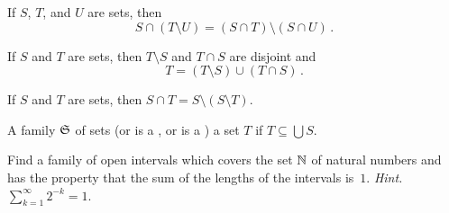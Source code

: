 \begin{prob} If $S$, $T$, and $U$ are sets, then
  \[ S \cap (T \setminus U)  = (S  \cap T)  \setminus (S \cap U)\,. \]
\end{prob}

\begin{prob}\label{prob_sdiff1} If $S$ and $T$ are sets, then $T \setminus S$ and $T \cap S$
are disjoint and
   \[ T = (T \setminus S) \cup (T \cap S)\,. \]
\end{prob}

\begin{prob} If $S$ and $T$ are sets, then $S \cap T  =  S \setminus (S \setminus T)$.
\end{prob}

\begin{defn} A family $\mathfrak{S}$ of sets
 (or is a
, or is a
) a set $T$ if $T \subseteq \bigcup S$.
\end{defn}

\begin{prob}  Find a family of open intervals which covers the set $\mathbb{N}$ of natural numbers and has
the property that the sum of the lengths of the intervals is~$1$.  \emph{Hint.}
$\sum_{k=1}^\infty 2^{-k} = 1$.
\end{prob}


\endinput
